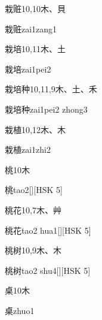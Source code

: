 \begin{entry}{栽赃}{10,10}{⽊、⾙}
  \begin{phonetics}{栽赃}{zai1zang1}
  \end{phonetics}
\end{entry}

\begin{entry}{栽培}{10,11}{⽊、⼟}
  \begin{phonetics}{栽培}{zai1pei2}
  \end{phonetics}
\end{entry}

\begin{entry}{栽培种}{10,11,9}{⽊、⼟、⽲}
  \begin{phonetics}{栽培种}{zai1pei2 zhong3}
  \end{phonetics}
\end{entry}

\begin{entry}{栽植}{10,12}{⽊、⽊}
  \begin{phonetics}{栽植}{zai1zhi2}
  \end{phonetics}
\end{entry}

\begin{entry}{桃}{10}{⽊}
  \begin{phonetics}{桃}{tao2}[][HSK 5]
  \end{phonetics}
\end{entry}

\begin{entry}{桃花}{10,7}{⽊、⾋}
  \begin{phonetics}{桃花}{tao2 hua1}[][HSK 5]
  \end{phonetics}
\end{entry}

\begin{entry}{桃树}{10,9}{⽊、⽊}
  \begin{phonetics}{桃树}{tao2 shu4}[][HSK 5]
  \end{phonetics}
\end{entry}

\begin{entry}{桌}{10}{⽊}
  \begin{phonetics}{桌}{zhuo1}
  \end{phonetics}
\end{entry}


